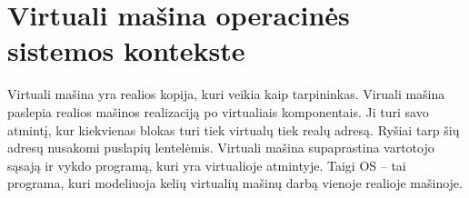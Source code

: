 \section{Virtuali mašina operacinės sistemos kontekste}

Virtuali mašina yra realios kopija, kuri veikia kaip tarpininkas. Viruali mašina paslepia realios mašinos realizaciją po virtualiais komponentais. Ji turi savo atmintį, kur kiekvienas blokas turi tiek virtualų tiek realų adresą. Ryšiai tarp šių adresų nusakomi puslapių lentelėmis. Virtuali mašina supaprastina vartotojo sąsają ir vykdo programą, kuri yra virtualioje atmintyje.
Taigi OS – tai programa, kuri modeliuoja kelių virtualių mašinų darbą vienoje realioje mašinoje.

\newpage



